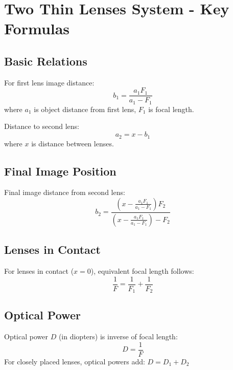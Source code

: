 \documentclass{article}
\begin{document}
\section*{Two Thin Lenses System - Key Formulas}

\subsection*{Basic Relations}
For first lens image distance: 
\[b_1=\frac{a_1F_1}{a_1-F_1}\]
where $a_1$ is object distance from first lens, $F_1$ is focal length.

Distance to second lens:
\[a_2=x-b_1\]
where $x$ is distance between lenses.

\subsection*{Final Image Position}
Final image distance from second lens:
\[b_2=\frac{\left(x-\frac{a_1F_1}{a_1-F_1}\right)F_2}{\left(x-\frac{a_1F_1}{a_1-F_1}\right)-F_2}\]

\subsection*{Lenses in Contact}
For lenses in contact ($x=0$), equivalent focal length follows:
\[\frac{1}{F}=\frac{1}{F_1}+\frac{1}{F_2}\]

\subsection*{Optical Power}
Optical power $D$ (in diopters) is inverse of focal length:
\[D=\frac{1}{F}\]
For closely placed lenses, optical powers add: $D=D_1+D_2$
\end{document}
